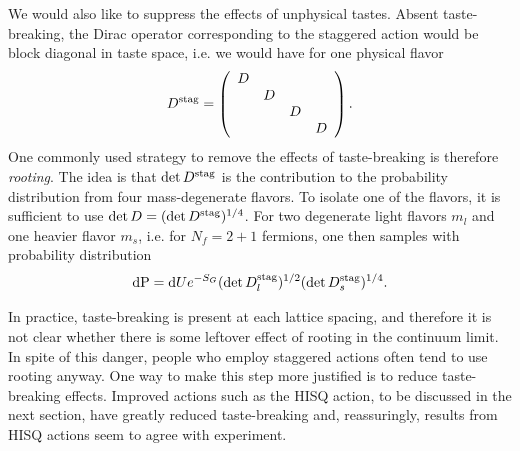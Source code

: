 We would also like to suppress the effects of unphysical tastes. Absent
taste-breaking, the Dirac operator corresponding to the staggered action
would be block diagonal in taste space, i.e. we would have for 
one physical flavor
\begin{equation}
D^{\rm stag}=\left(\begin{array}{cccc}
            D &   &  &  \\
              & D &  &  \\
              &   & D&  \\
              &   &  & D\\
            \end{array}\right).
\end{equation}
One commonly used strategy to remove the effects of taste-breaking is
therefore {\it rooting}. The idea is that $\det D^{\rm stag}$ is
the contribution to the probability distribution from four mass-degenerate
flavors. To isolate one of the flavors, it is sufficient to use
$\det D=(\det D^{\rm stag})^{1/4}$. For two degenerate light flavors
$m_l$ and one heavier flavor $m_s$, i.e. for $N_f=2+1$ fermions, 
one then samples with probability distribution
\begin{equation}
  \dd{\rm P}
    =\dd Ue^{-S_G}(\det D_l^{\rm stag})^{1/2}(\det D_s^{\rm stag})^{1/4}.
\end{equation}

In practice, taste-breaking is present at each lattice spacing, and
therefore it is not clear whether there is some leftover effect of rooting
in the continuum limit. In spite of this danger, people who employ staggered
actions often tend to use rooting anyway. One way to make this step more
justified is to reduce taste-breaking effects. Improved actions such
as the HISQ action, to be discussed in the next section, have greatly
reduced taste-breaking and, reassuringly, results from HISQ actions
seem to agree with experiment.


